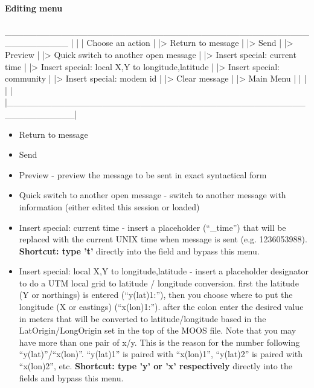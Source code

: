 \documentclass[11pt, letterpaper, oneside]{memoir}
\begin{document}
\begin{itemize}
\paragraph{Editing menu}
\begin{boxedverbatim}
        __________________________________________________________
       |                                                          |
       |                     Choose an action                     |
       |> Return to message                                       |
       |> Send                                                    |
       |> Preview                                                 |
       |> Quick switch to another open message                    |
       |> Insert special: current time                            |
       |> Insert special: local X,Y to longitude,latitude         |
       |> Insert special: community                               |
       |> Insert special: modem id                                |
       |> Clear message                                           |
       |> Main Menu                                               |
       |                                                          |
       |                                                          |
       |__________________________________________________________|
\end{boxedverbatim}
\resetbvlinenumber
\begin{itemize}
\item Return to message
\item Send
\item Preview - preview the message to be sent in exact syntactical form
\item Quick switch to another open message - switch to another message with information (either edited this session or loaded)
\item Insert special: current time - insert a placeholder (``\_time'') that will be replaced with the current UNIX time when message is sent (e.g. 1236053988). \textbf{Shortcut: type 't'} directly into the field and bypass this menu.
\item Insert special: local X,Y to longitude,latitude - insert a placeholder designator to do a UTM local grid to latitude / longitude conversion. first the latitude (Y or northings) is entered (``y(lat)1:''), then you choose where to put the longitude (X or eastings) (``x(lon)1:''). after the colon enter the desired value in meters that will be converted to latitude/longitude based in the LatOrigin/LongOrigin set in the top of the MOOS file. Note that you may have more than one pair of x/y. This is the reason for the number following ``y(lat)''/``x(lon)''. ``y(lat)1'' is paired with ``x(lon)1'', ``y(lat)2'' is paired with ``x(lon)2'', etc. \textbf{Shortcut: type 'y' or 'x' respectively} directly into the fields and bypass this menu.

\end{itemize}
\end{itemize}
\end{document}
